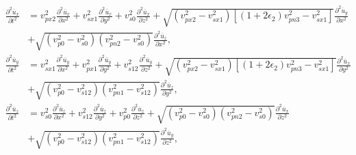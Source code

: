 \begin{equation}
\label{eq:ort}
\begin{split}
\frac{\partial^2\overline{u}_x}{\partial t^2} &= {v_{px2}^2}\frac{\partial^2{\overline{u}_x}}{\partial x^2}
                                              + {v_{sx1}^2}\frac{\partial^2{\overline{u}_x}}{\partial y^2}
                                              + {v_{s0}^2}\frac{\partial^2{\overline{u}_x}}{\partial z^2}
                                              + \sqrt{({v_{px2}^2}-{v_{sx1}^2})[(1+2\epsilon_{2}){v_{pn3}^2}-{v_{sx1}^2}]}
                                                \frac{\partial^2{\overline{u}_y}}{\partial x^2} \\
                                              &+ \sqrt{({v_{p0}^2}-{v_{s0}^2})({v_{pn2}^2}-{v_{s0}^2})}
                                                \frac{\partial^2{\overline{u}_z}}{\partial x^2}, \\
\frac{\partial^2\overline{u}_y}{\partial t^2} &= {v_{sx1}^2}\frac{\partial^2{\overline{u}_y}}{\partial x^2}
                                              + {v_{px1}^2}\frac{\partial^2{\overline{u}_y}}{\partial y^2}
                                              + {v_{s12}^2}\frac{\partial^2{\overline{u}_y}}{\partial z^2}
                                              + \sqrt{({v_{px2}^2}-{v_{sx1}^2})[(1+2\epsilon_{2}){v_{pn3}^2}-{v_{sx1}^2}]}
                                                \frac{\partial^2{\overline{u}_x}}{\partial y^2} \\
                                              &+ \sqrt{({v_{p0}^2}-{v_{s12}^2})({v_{pn1}^2}-{v_{s12}^2}) }
                                                \frac{\partial^2{\overline{u}_z}}{\partial y^2}, \\
\frac{\partial^2\overline{u}_z}{\partial t^2} & = {v_{s0}^2}\frac{\partial^2{\overline{u}_z}}{\partial x^2}
                                              + {v_{s12}^2}\frac{\partial^2{\overline{u}_z}}{\partial y^2}
                                              + {v_{p0}^2}\frac{\partial^2{\overline{u}_z}}{\partial z^2}
                                              + \sqrt{({v_{p0}^2}-{v_{s0}^2})({v_{pn2}^2}-{v_{s0}^2}) }
                                                \frac{\partial^2{\overline{u}_x}}{\partial z^2} \\
                                              &+ \sqrt{({v_{p0}^2}-{v_{s12}^2})({v_{pn1}^2}-{v_{s12}^2}) }
                                                \frac{\partial^2{\overline{u}_y}}{\partial z^2},
\end{split}
\end{equation}
